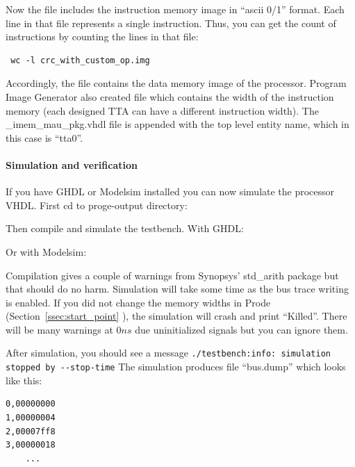 \documentclass[twoside]{tceusermanual}
\begin{document}
Now the file  includes the instruction memory
image in ``ascii 0/1'' format. Each line in that file represents a single
instruction. Thus, you can get the count of instructions by counting the
lines in that file:

\begin{verbatim}
 wc -l crc_with_custom_op.img
\end{verbatim}


Accordingly, the file  contains the data
memory image of the processor. Program Image Generator also created file
 which contains the 
width of the instruction memory (each designed TTA can have a different 
instruction width). The \_imem\_mau\_pkg.vhdl file is appended with the top
level entity name, which in this case is ``tta0''.

\paragraph{Simulation and verification}

If you have GHDL or Modelsim installed you can now simulate the processor VHDL.
First cd to proge-output directory:


Then compile and simulate the testbench. With GHDL:



Or with Modelsim:



Compilation gives a couple of warnings from Synopsys' std\_arith
package but that should do no harm.  Simulation will take some time as
the bus trace writing is enabled. If you did not change the memory
widths in Prode (Section~\ref{ssec:start_point} ), the simulation will crash and print
``Killed''. There will be many warnings at $0 ns$ due uninitialized
signals but you can ignore them. 

After simulation, you should see a message
\verb|./testbench:info: simulation stopped by --stop-time|
The simulation produces file ``bus.dump'' which looks like this:
\begin{verbatim}
0,00000000
1,00000004
2,00007ff8
3,00000018
    ...
\end{verbatim}
\end{document}
